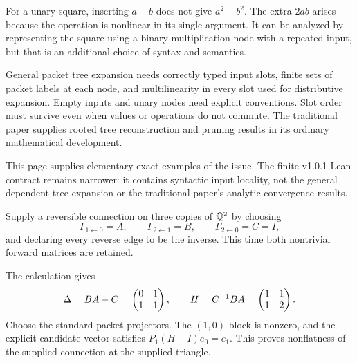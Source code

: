 
For a unary square, inserting $a+b$ does not give $a^2+b^2$. The extra $2ab$ arises because the operation is nonlinear in its single argument. It can be analyzed by representing the square using a binary multiplication node with a repeated input, but that is an additional choice of syntax and semantics.

General packet tree expansion needs correctly typed input slots, finite sets of packet labels at each node, and multilinearity in every slot used for distributive expansion. Empty inputs and unary nodes need explicit conventions. Slot order must survive even when values or operations do not commute. The traditional paper supplies rooted tree reconstruction and pruning results in its ordinary mathematical development.

This page supplies elementary exact examples of the issue. The finite v1.0.1 Lean contract remains narrower: it contains syntactic input locality, not the general dependent tree expansion or the traditional paper's analytic convergence results.


Supply a reversible connection on three copies of $\mathbb Q^2$ by choosing
\[
\Gamma_{1\leftarrow0}=A,\qquad\Gamma_{2\leftarrow1}=B,
\qquad\Gamma_{2\leftarrow0}=C=I,
\]
and declaring every reverse edge to be the inverse. This time both nontrivial forward matrices are retained.


The calculation gives
\[
\Delta=BA-C=\begin{pmatrix}0&1\\1&1\end{pmatrix},\qquad H=C^{-1}BA=\begin{pmatrix}1&1\\1&2\end{pmatrix}.
\]
Choose the standard packet projectors. The $(1,0)$ block is nonzero, and the explicit candidate vector satisfies $P_1(H-I)e_0=e_1$. This proves nonflatness of the supplied connection at the supplied triangle.

